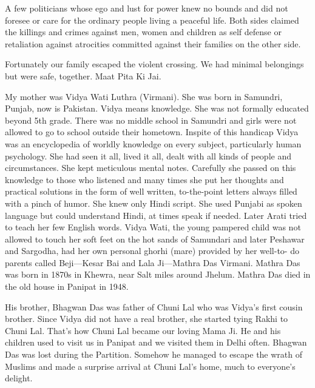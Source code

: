 A few politicians whose ego and lust for power knew no bounds and did not foresee or care for the ordinary people living a peaceful life. Both sides claimed the killings and crimes against men, women and children as self defense or retaliation against atrocities committed against their families on the other side. 

Fortunately our family escaped the violent crossing. We had minimal belongings but were safe, together. Maat Pita Ki Jai. 

 My mother was Vidya Wati Luthra (Virmani). She was born in Samundri, Punjab, now is Pakistan. Vidya means knowledge. She was not formally educated beyond 5th grade. There was no middle school in Samundri and girls were not allowed to go to school outside their hometown. Inspite of this handicap Vidya was an encyclopedia of worldly knowledge on every subject, particularly human psychology. She had seen it all, lived it all, dealt with all kinds of people and circumstances. She kept meticulous mental notes. Carefully she passed on this knowledge to those who listened and many times she put her thoughts and practical solutions in the form of well written, to-the-point letters always filled with a pinch of humor. She knew only Hindi script. She used Punjabi as spoken language but could understand Hindi, at times speak if needed. Later Arati tried to teach her few English words. 
Vidya Wati, the young pampered child was not allowed to touch her soft feet on the hot sands of Samundari and later Peshawar and Sargodha, had her own personal ghorhi (mare) provided by her well-to- 
do parents called Beji—Kesar Bai and Lala Ji—Mathra Das Virmani. Mathra Das was born in 1870s in Khewra, near Salt miles around Jhelum. Mathra Das died in the old house in Panipat in 1948. 

His brother, Bhagwan Das was father of Chuni Lal who was Vidya’s first cousin brother. Since Vidya did not have a real brother, she started tying Rakhi to Chuni Lal. That’s how Chuni Lal became our loving Mama Ji. He and his children used to visit us in Panipat and we visited them in Delhi often. Bhagwan Das was lost during the Partition. Somehow he managed to escape the wrath of Muslims and made a surprise arrival at Chuni Lal’s home, much to everyone’s delight. 

